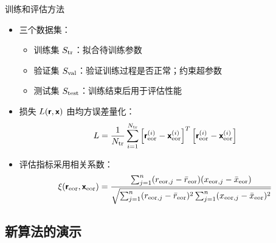 \documentclass{beamer}
\begin{document}
\begin{frame}[t]
  \begin{alertblock}{训练和评估方法}
  \end{alertblock}
  \begin{itemize}
    \item 三个数据集：
      \begin{itemize}
        \item \alert{训练集 $S_{\text{tr}}$}：拟合待训练参数
        \item \alert{验证集 $S_{\text{val}}$}：验证训练过程是否正常；约束超参数
        \item \alert{测试集 $S_{\text{test}}$}：训练结束后用于评估性能
      \end{itemize}
    \item 损失 $L(\bm{\mathsf{r}}, \bm{\mathsf{x}})$ 由\alert{均方误差}量化：
      \begin{equation}
        L = \frac{1}{N_{\text{tr}}} \sum_{i=1}^{N_{\text{tr}}}
            \left[ \bm{\mathsf{r}}_{\text{eor}}^{(i)} - \bm{\mathsf{x}}_{\text{eor}}^{(i)} \right]^T
            \left[ \bm{\mathsf{r}}_{\text{eor}}^{(i)} - \bm{\mathsf{x}}_{\text{eor}}^{(i)} \right]
      \end{equation}
    \item 评估指标采用\alert{相关系数}：
      \begin{equation}
        \xi(\bm{\mathsf{r}}_{\text{eor}}, \bm{\mathsf{x}}_{\text{eor}})
          = \frac{\sum_{j=1}^{n}(r_{\text{eor},j} - \bar{r}_{\text{eor}})
              (x_{\text{eor},j} - \bar{x}_{\text{eor}})}{
                \sqrt{\sum_{j=1}^{n}(r_{\text{eor},j} - \bar{r}_{\text{eor}})^2
                \sum_{j=1}^{n}(x_{\text{eor},j} - \bar{x}_{\text{eor}})^2}
            }
      \end{equation}
  \end{itemize}
\end{frame}

\subsection{新算法的演示}
\end{document}
